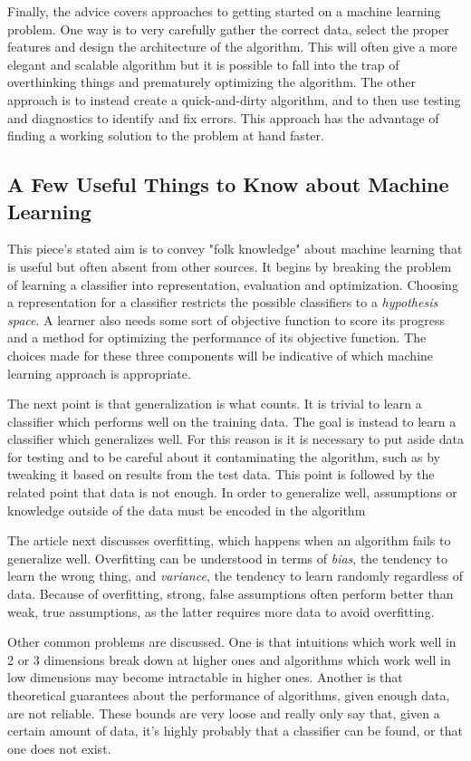 \documentclass[12pt]{article}
\begin{document}
Finally, the advice covers approaches to getting started on a machine learning problem. One way is to very carefully gather the correct data, select the proper features and design the architecture of the algorithm. This will often give a more elegant and scalable algorithm but it is possible to fall into the trap of overthinking things and prematurely optimizing the algorithm. The other approach is to instead create a quick-and-dirty algorithm, and to then use testing and diagnostics to identify and fix errors. This approach has the advantage of finding a working solution to the problem at hand faster.

\subsection*{A Few Useful Things to Know about Machine Learning}
This piece's stated aim is to convey "folk knowledge" about machine learning that is useful but often absent from other sources. It begins by breaking the problem of learning a classifier into representation, evaluation and optimization. Choosing a representation for a classifier restricts the possible classifiers to a \textit{hypothesis space}. A learner also needs some sort of objective function to score its progress and a method for optimizing the performance of its objective function. The choices made for these three components will be indicative of which machine learning approach is appropriate.

The next point is that generalization is what counts. It is trivial to learn a classifier which performs well on the training data. The goal is instead to learn a classifier which generalizes well. For this reason is it is necessary to put aside data for testing and to be careful about it contaminating the algorithm, such as by tweaking it based on results from the test data. This point is followed by the related point that data is not enough. In order to generalize well, assumptions or knowledge outside of the data must be encoded in the algorithm

The article next discusses overfitting, which happens when an algorithm fails to generalize well. Overfitting can be understood in terms of \textit{bias}, the tendency to learn the wrong thing, and \textit{variance}, the tendency to learn randomly regardless of data. Because of overfitting, strong, false assumptions often perform better than weak, true assumptions, as the latter requires more data to avoid overfitting.

Other common problems are discussed. One is that intuitions which work well in  2 or 3 dimensions break down at higher ones and algorithms which work well in low dimensions may become intractable in higher ones. Another is that theoretical guarantees about the performance of algorithms, given enough data, are not reliable. These bounds are very loose and really only say that, given a certain amount of data, it's highly probably that a classifier can be found, or that one does not exist.
\end{document}
